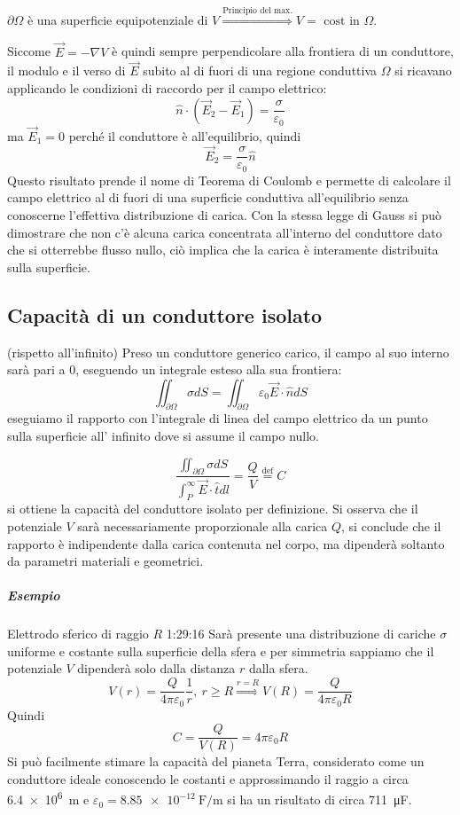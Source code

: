 $\partial \Omega$ è una superficie equipotenziale di $V \stackrel{\text{Principio del max.}}{\Rightarrow} V = \text{ cost in } \Omega$.

Siccome $\vec{E} = -\nabla V$ è quindi sempre perpendicolare alla frontiera di un conduttore,
il modulo e il verso di $\vec{E}$ subito al di fuori di una regione conduttiva $\Omega$ 
si ricavano applicando le condizioni di raccordo per il campo elettrico:
$$
\hat{n}\cdot (\vec{E}_2-\vec{E}_1) = \frac{\sigma}{\varepsilon_0}
$$
ma $\vec{E}_1 = 0$ perché il conduttore è all'equilibrio, quindi 
$$
\vec{E}_2 = \frac{\sigma}{\varepsilon_0} \hat{n}
$$
Questo risultato prende il nome di Teorema di Coulomb e permette di calcolare il campo elettrico al 
di fuori di una superficie conduttiva all'equilibrio senza conoscerne l'effettiva distribuzione di 
carica.
Con la stessa legge di Gauss si può dimostrare che non c'è alcuna carica concentrata all'interno
del conduttore dato che si otterrebbe flusso nullo, ciò implica che la carica è interamente
distribuita sulla superficie.

\subsection{Capacità di un conduttore isolato} (rispetto all'infinito)
Preso un conduttore generico carico, il campo al suo interno sarà pari a 0, eseguendo un integrale
esteso alla sua frontiera:
$$
\iint_{\partial \Omega}\sigma dS = \iint_{\partial \Omega} \varepsilon_0 \vec{E}\cdot \hat{n} dS
$$
eseguiamo il rapporto con l'integrale di linea del campo elettrico da un punto sulla superficie all'
infinito dove si assume il campo nullo.

$$
\frac{\iint_{\partial \Omega}\sigma dS }{\int_P^\infty \vec{E}\cdot\hat{t}dl } = \frac{Q}{V} \stackrel{\text{def}}{=} C
$$
si ottiene la capacità del conduttore isolato per definizione.
Si osserva che il potenziale $V$ sarà necessariamente proporzionale alla carica $Q$, si 
conclude che il rapporto è indipendente dalla carica contenuta nel corpo, ma dipenderà soltanto da
parametri materiali e geometrici.
\subparagraph{Esempio}
Elettrodo sferico di raggio $R$
1:29:16
Sarà presente una distribuzione di cariche $\sigma$ uniforme e costante sulla superficie della sfera
e per simmetria sappiamo che il potenziale $V$ dipenderà solo dalla distanza $r$ dalla sfera.
$$
V(r) = \frac{Q}{4 \pi \varepsilon_0}\frac{1}{r},\ r\geq R \stackrel{r=R}{\Rightarrow} V(R) = 
\frac{Q}{4\pi\varepsilon_0 R}
$$
Quindi 
$$
C = \frac{Q}{V(R)} = 4\pi\varepsilon_0 R
$$
Si può facilmente stimare la capacità del pianeta Terra, considerato come un conduttore ideale
conoscendo le costanti e approssimando il raggio a circa \SI{6.4e6}{\meter} e $\varepsilon_0 = 
\SI{8.85e-12}{\farad\per\meter}$ si ha un risultato di circa \SI{711}{\micro\farad}.

